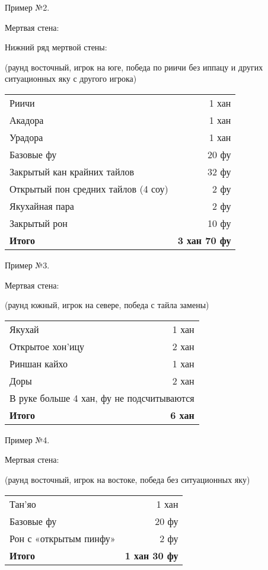 Пример №2.

 \hfill {}

Мертвая стена: 

Нижний ряд мертвой стены: 

(раунд восточный, игрок на юге, победа по риичи без иппацу и других ситуационных яку с другого игрока)

\begin{tabular}{lr}
	Риичи & 1 хан \\
	Акадора & 1 хан \\
	Урадора & 1 хан \\
	Базовые фу & 20 фу \\
	Закрытый кан крайних тайлов & 32 фу \\
	Открытый пон средних тайлов (4 соу) & 2 фу \\
	Якухайная пара & 2 фу \\
	Закрытый рон & 10 фу \\
	\hline
	\textbf{Итого} & \textbf{3 хан 70 фу} \\
\end{tabular}

Пример №3. 


Мертвая стена: 

(раунд южный, игрок на севере, победа с тайла замены)

\begin{tabular}{lr}
	Якухай & 1 хан \\
	Открытое хон'ицу & 2 хан \\
	Риншан кайхо & 1 хан \\
	Доры & 2 хан \\
	\multicolumn{2}{l}{В руке больше 4 хан, фу не подсчитываются} \\
	\hline
	\textbf{Итого} & \textbf{6 хан} \\
\end{tabular}

Пример №4.

 \hfill {}

Мертвая стена: 

(раунд восточный, игрок на востоке, победа без ситуационных яку)

\begin{tabular}{lr}
	Тан'яо & 1 хан \\
	Базовые фу & 20 фу \\
	Рон с «открытым пинфу» & 2 фу \\
	\hline
	\textbf{Итого} & \textbf{1 хан 30 фу} \\
\end{tabular}

